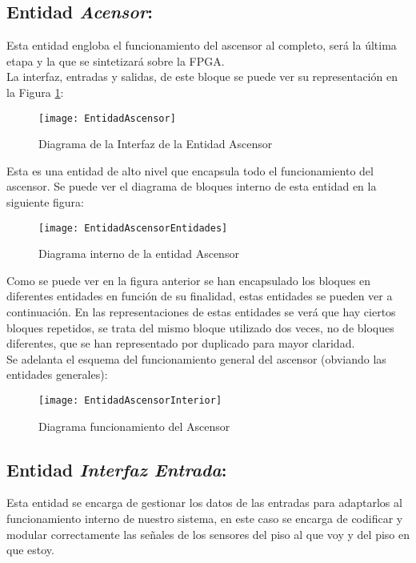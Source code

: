 \subsection{Entidad \textit{Acensor}:} \label{bloque:Ascensor}
    Esta entidad engloba el funcionamiento del ascensor al completo, será la última etapa y la que se sintetizará sobre la FPGA.\\

    La interfaz, entradas y salidas, de este bloque se puede ver su representación en la Figura \ref{fig:EntidadIAscensor}:
    
    \begin{figure}[H]
		    \centering
		    \texttt{[image: EntidadAscensor]}
		    \caption{Diagrama de la Interfaz de la Entidad Ascensor}
		    \label{fig:EntidadIAscensor}
	\end{figure}
	
	Esta es una entidad de alto nivel que encapsula todo el funcionamiento del ascensor. Se puede ver el diagrama de bloques interno de esta entidad en la siguiente figura: 
	
	\begin{figure}[H]
		    \centering
		    \texttt{[image: EntidadAscensorEntidades]}
		    \caption{Diagrama interno de la entidad Ascensor}
		    \label{fig:EntidadIAscensorEntidades}
	\end{figure}
	
	Como se puede ver en la figura anterior se han encapsulado los bloques en diferentes entidades en función de su finalidad, estas entidades se pueden ver a continuación. En las representaciones de estas entidades se verá que hay ciertos bloques repetidos, se trata del mismo bloque utilizado dos veces, no de bloques diferentes, que se han representado por duplicado para mayor claridad. \\ 

	Se adelanta el esquema del funcionamiento general del ascensor (obviando las entidades generales):

	\begin{figure}[H]
		    \centering
		    \texttt{[image: EntidadAscensorInterior]}
		    \caption{Diagrama funcionamiento del Ascensor}
		    \label{fig:EntidadIAscensorInterior}
	\end{figure}

\subsection{Entidad \textit{Interfaz Entrada}:} \label{bloque:InterfazEntrada}
	Esta entidad se encarga de gestionar los datos de las entradas para adaptarlos al funcionamiento interno de nuestro sistema, en este caso se encarga de codificar y modular correctamente las señales de los sensores del piso al que voy y del piso en que estoy. \\ 


